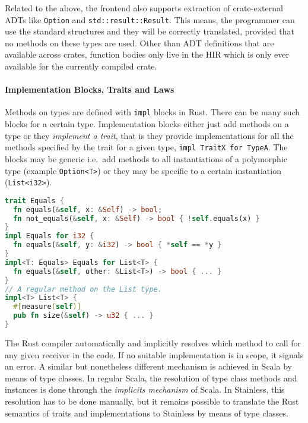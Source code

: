 Related to the above, the frontend also supports extraction of
crate-external ADTs like \passthrough{\lstinline!Option!} and
\passthrough{\lstinline!std::result::Result!}. This means, the
programmer can use the standard structures and they will be correctly
translated, provided that no methods on these types are used. Other than
ADT definitions that are available across crates, function bodies only
live in the HIR which is only ever available for the currently compiled
crate.

\paragraph{Implementation Blocks, Traits and Laws}

Methods on types are defined with \passthrough{\lstinline!impl!} blocks
in Rust. There can be many such blocks for a certain type.
Implementation blocks either just add methods on a type or they
\emph{implement a trait}, that is they provide implementations for all
the methods specified by the trait for a given type,
\passthrough{\lstinline!impl TraitX for TypeA!}. The blocks may be
generic i.e.~add methods to all instantiations of a polymorphic type
(example \passthrough{\lstinline!Option<T>!}) or they may be specific to
a certain instantiation (\passthrough{\lstinline!List<i32>!}).

\begin{lstlisting}[language=Rust, caption={Rust trait with two implementations.}]
trait Equals {
  fn equals(&self, x: &Self) -> bool;
  fn not_equals(&self, x: &Self) -> bool { !self.equals(x) }
}
impl Equals for i32 {
  fn equals(&self, y: &i32) -> bool { *self == *y }
}
impl<T: Equals> Equals for List<T> {
  fn equals(&self, other: &List<T>) -> bool { ... }
}
// A regular method on the List type.
impl<T> List<T> {
  #[measure(self)]
  pub fn size(&self) -> u32 { ... }
}
\end{lstlisting}

The Rust compiler automatically and implicitly resolves which method to
call for any given receiver in the code. If no suitable implementation
is in scope, it signals an error. A similar but nonetheless different
mechanism is achieved in Scala by means of type classes. In regular
Scala, the resolution of type class methods and instances is done
through the \emph{implicits mechanism} of Scala. In Stainless, this
resolution has to be done manually, but it remains possible to translate
the Rust semantics of traits and implementations to Stainless by means
of type classes.

